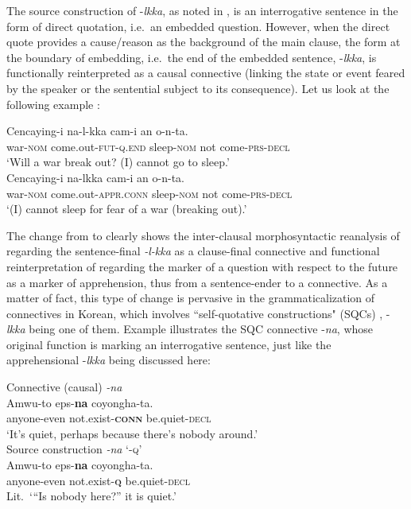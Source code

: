 \documentclass[output=paper,colorlinks,citecolor=brown]{langscibook}
\begin{document}
The source construction of \nobreakdash-\textit{lkka}, as noted in , is an interrogative sentence in the form of direct quotation, i.e.\  an embedded question. However, when the direct quote provides a cause/reason as the background of the main clause, the form at the boundary of embedding, i.e.\  the end of the embedded sentence, \nobreakdash-\textit{lkka}, is functionally reinterpreted as a causal connective (linking the state or event feared by the speaker or the sentential subject to its consequence). Let us look at the following example :


\ea \label{ex:RK18}
\ea \label{ex:RK18a}
\gll Cencaying-i na-l-kka cam-i an o-n-ta. \\
war-\textsc{nom} come.out-\textsc{fut-q.end} sleep-\textsc{nom} not come-\textsc{prs-decl} \\
\glt `Will a war break out? (I) cannot go to sleep.' \\
\ex \label{ex:RK18b}
\gll Cencaying-i na-lkka cam-i an o-n-ta. \\
war-\textsc{nom} come.out-\textsc{appr.conn} sleep-\textsc{nom} not come-\textsc{prs-decl} \\
\glt `(I) cannot sleep for fear of a war (breaking out).'
\z
\z

\noindent The change from  to  clearly shows the inter-clausal morphosyntactic reanalysis of regarding the sentence-final \textit{-l-kka} as a clause-final connective and functional reinterpretation of regarding the marker of a question with respect to the future as a marker of apprehension, thus from a sentence-ender to a connective. As a matter of fact, this type of change is pervasive in the grammaticalization of connectives in Korean, which involves ``self-quotative constructions" (SQCs) \citep[256]{KooRhee2019}, \nobreakdash-\textit{lkka} being one of them. Example  illustrates the SQC connective \nobreakdash-\textit{na}, whose original function is marking an interrogative sentence, just like the apprehensional \nobreakdash-\textit{lkka} being discussed here:

\ea \label{ex:RK19}
\ea \label{ex:RK19a} \textnormal{Connective (causal)} \textit{-na} \\
\gll Amwu-to eps-\textbf{na} coyongha-ta. \\
anyone-even not.exist-\textsc{\textbf{conn}} be.quiet-\textsc{decl} \\
\glt `It's quiet, perhaps because there's nobody around.' \\
\ex \label{ex:RK19b} \textnormal{Source construction \textit{-na} \textsc{`-q'}} \\
\gll Amwu-to eps-\textbf{na} coyongha-ta. \\
anyone-even not.exist-\textsc{\textbf{q}} be.quiet-\textsc{decl} \\
\glt Lit.\ {`}``Is nobody here?'' it is quiet.' \citep[267]{KooRhee2019} \\
\z
\z
\end{document}
